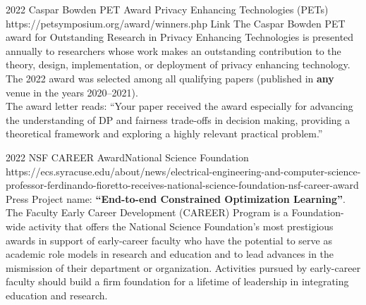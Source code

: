 

\begin{awards}
	\awardentryD
	{2022}
	{Caspar Bowden PET Award}%
	{Privacy Enhancing Technologies (PETs)}
	{https://petsymposium.org/award/winners.php}
	{Link}
	{The Caspar Bowden PET award for Outstanding Research in Privacy Enhancing Technologies is presented annually to researchers 
	whose work makes an outstanding contribution to the theory, design, implementation, or deployment of privacy enhancing technology. The 2022 award was selected among all qualifying papers (published in \textbf{any} venue in the years 2020--2021).\\
	The award letter reads: ``Your paper  received the award especially for advancing the understanding of DP and fairness trade-offs in decision making, providing a theoretical framework and exploring a highly relevant practical problem.''}

	\awardentryD
	{2022}
	{NSF CAREER Award}{National Science Foundation}
	{https://ecs.syracuse.edu/about/news/electrical-engineering-and-computer-science-professor-ferdinando-fioretto-receives-national-science-foundation-nsf-career-award}
	{Press}
	{Project name: \textbf{``End-to-end Constrained Optimization Learning''}.\\ 
	The Faculty Early Career Development (CAREER) Program is a Foundation-wide 
	activity that offers the National Science Foundation's most prestigious awards in support of early-career faculty who have the potential to serve as academic role models in research and education and to lead advances in the mismission of their department or organization. Activities pursued by early-career faculty should build a firm foundation for a lifetime of leadership in integrating education and research. 
	}


\end{awards}
